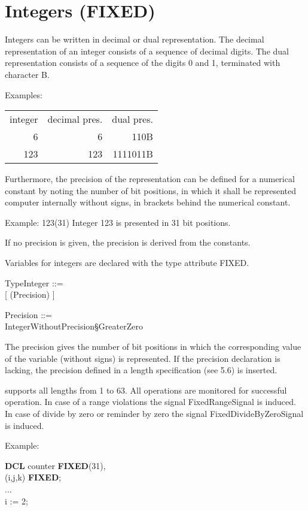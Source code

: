 \section{Integers (FIXED)}   %

Integers can be written in decimal or dual representation. The decimal
representation of an integer consists of a sequence of decimal digits. The dual
representation consists of a sequence of the digits 0 and 1, terminated
with character B.

Examples:

\begin{tabular}{rrr}
integer & decimal pres. & dual pres. \\
      6 &             6 &     110B \\
    123 &           123 & 1111011B
\end{tabular}

Furthermore, the precision of the representation can be defined for a
numerical constant by noting the number of bit positions, in which it
shall be represented computer internally without signs, in brackets behind
the numerical constant.

Example: 123(31) \x Integer 123 is presented in 31 bit positions.

If no precision is given, the precision is derived from the constants.

Variables for integers are declared with the type attribute FIXED.

TypeInteger ::=\\
 [ (Precision) ]

Precision ::=\\
\x IntegerWithoutPrecision\S GreaterZero

The precision gives the number of bit positions in which the
corresponding value of the variable (without signs) is represented. If
the precision declaration is lacking, the precision defined in a length
specification (see 5.6) is inserted. 

\begin{added}
\OpenPEARL{} supports all lengths from 1 to 63.
All operations are monitored for successful operation.
In case of a range violations the signal FixedRangeSignal is induced.
In case of divide by zero or reminder by zero the signal FixedDivideByZeroSignal
is induced.
\end{added}

Example:

{\bf DCL} counter {\bf FIXED}(31),\\
\x (i,j,k) {\bf FIXED};\\
...\\
i := 2;

